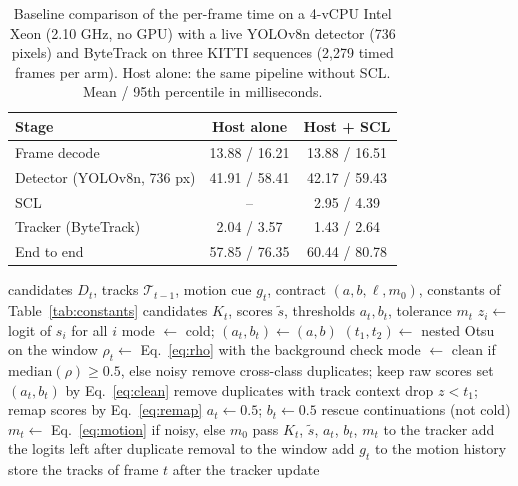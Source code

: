 \documentclass[pdflatex,sn-mathphys-num,iicol]{sn-jnl}
\newcommand{\scl}{SCL}
\begin{document}
\begin{table}[t]
\caption{Baseline comparison of the per-frame time on a 4-vCPU Intel Xeon
(2.10 GHz, no GPU) with a live YOLOv8n detector (736 pixels) and ByteTrack on
three KITTI sequences (2,279 timed frames per arm). Host alone: the same
pipeline without \scl{}. Mean / 95th percentile in milliseconds.}
\label{tab:runtime}
\centering\footnotesize
\setlength{\tabcolsep}{4pt}
\begin{tabular}{@{}lcc@{}}
\toprule
Stage & Host alone & Host + \scl{}\\
\midrule
Frame decode & 13.88 / 16.21 & 13.88 / 16.51\\
Detector (YOLOv8n, 736 px) & 41.91 / 58.41 & 42.17 / 59.43\\
\scl{} & -- & 2.95 / 4.39\\
Tracker (ByteTrack) & 2.04 / 3.57 & 1.43 / 2.64\\
End to end & 57.85 / 76.35 & 60.44 / 80.78\\
\bottomrule
\end{tabular}
\end{table}

\begin{algorithm}[t]
\caption{\scl{} for frame $t$. The window holds the logits of frames
$t-W$ to $t-1$, so the decision for frame $t$ uses no future frame.}\label{alg:layer}
\begin{algorithmic}[1]
\Require candidates $D_t$, tracks $\mathcal{T}_{t-1}$, motion cue $g_t$, contract $(a,b,\ell,m_0)$, constants of Table~\ref{tab:constants}
\Ensure candidates $K_t$, scores $\tilde{s}$, thresholds $a_t,b_t$, tolerance $m_t$
\State $z_i\gets$ logit of $s_i$ for all $i$ 
 
  \State mode $\gets$ cold; $(a_t,b_t)\gets(a,b)$
\Else
  \State $(t_1,t_2)\gets$ nested Otsu on the window 
  \State $\rho_t\gets$ Eq.~\eqref{eq:rho} with the background check
  \State mode $\gets$ clean if $\mathrm{median}(\rho)\ge0.5$, else noisy
\EndIf
{} 
  \State remove cross-class duplicates; keep raw scores
   set $(a_t,b_t)$ by Eq.~\eqref{eq:clean}
  \EndIf
\Else {}
  \State remove duplicates with track context
  \State drop $z<t_1$; remap scores by Eq.~\eqref{eq:remap}
  \State $a_t\gets0.5$; $b_t\gets0.5$
\EndIf
\State rescue continuations (not cold) 
\State $m_t\gets$ Eq.~\eqref{eq:motion} if noisy, else $m_0$
\State pass $K_t$, $\tilde{s}$, $a_t$, $b_t$, $m_t$ to the tracker
\State add the logits left after duplicate removal to the window
\State add $g_t$ to the motion history
\State store the tracks of frame $t$ after the tracker update
\end{algorithmic}
\end{algorithm}
\end{document}
